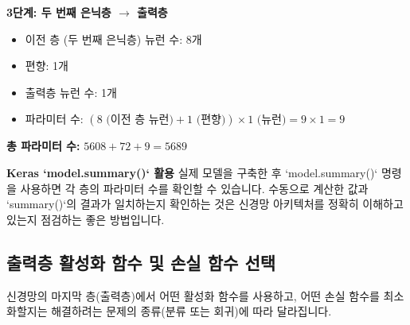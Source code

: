 \documentclass[11pt,a4paper]{article}
\begin{document}
\begin{enumerate}
\begin{examplebox}
    \textbf{3단계: 두 번째 은닉층 $\rightarrow$ 출력층}
    \begin{itemize}
        \item 이전 층 (두 번째 은닉층) 뉴런 수: 8개
        \item 편향: 1개
        \item 출력층 뉴런 수: 1개
        \item 파라미터 수: $(8 \text{ (이전 층 뉴런)} + 1 \text{ (편향)}) \times 1 \text{ (뉴런)} = 9 \times 1 = 9$
    \end{itemize}

    \textbf{총 파라미터 수:} $5608 + 72 + 9 = 5689$
    \end{examplebox}

    \begin{tipbox}
    \textbf{Keras `model.summary()` 활용}
    실제 모델을 구축한 후 `model.summary()` 명령을 사용하면 각 층의 파라미터 수를 확인할 수 있습니다. 수동으로 계산한 값과 `summary()`의 결과가 일치하는지 확인하는 것은 신경망 아키텍처를 정확히 이해하고 있는지 점검하는 좋은 방법입니다.
    \end{tipbox}
\end{enumerate}

\subsection{출력층 활성화 함수 및 손실 함수 선택}
신경망의 마지막 층(출력층)에서 어떤 활성화 함수를 사용하고, 어떤 손실 함수를 최소화할지는 해결하려는 문제의 종류(분류 또는 회귀)에 따라 달라집니다.
\end{document}
